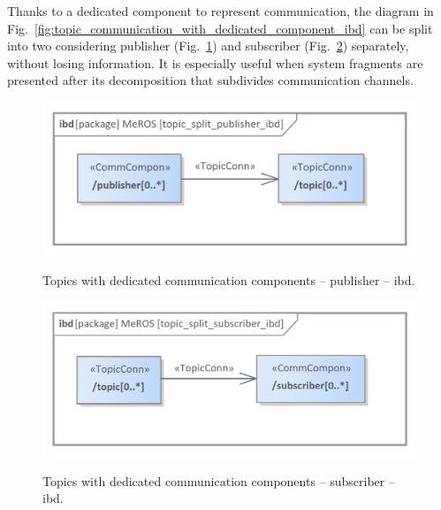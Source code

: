 \documentclass[11pt,oneside,a4paper]{article}
\begin{document}
	Thanks to a dedicated component to represent communication, the diagram in Fig.~\ref{fig:topic_communication_with_dedicated_component_ibd} can be split into two considering publisher (Fig.~\ref{fig:topic_split_publisher_ibd}) and subscriber (Fig.~\ref{fig:topic_split_subscriber_ibd}) separately, without losing information. It is especially useful when system fragments are presented after its decomposition that subdivides communication channels.
	

	\begin{figure}[H]
		\centering
		\begin{center}
			{\includegraphics[scale=1.0]{img/meros_pkg/topic_split_publisher_ibd.png}}
		\end{center}
		\caption{Topics with dedicated communication components -- publisher -- ibd.} 
		\label{fig:topic_split_publisher_ibd}
	\end{figure}


	\begin{figure}[H]
		\centering
		\begin{center}
			{\includegraphics[scale=1.0]{img/meros_pkg/topic_split_subscriber_ibd.png}}
		\end{center}
		\caption{Topics with dedicated communication components -- subscriber -- ibd.} 
		\label{fig:topic_split_subscriber_ibd}
	\end{figure}
	
	\pagebreak
	
\end{document}
